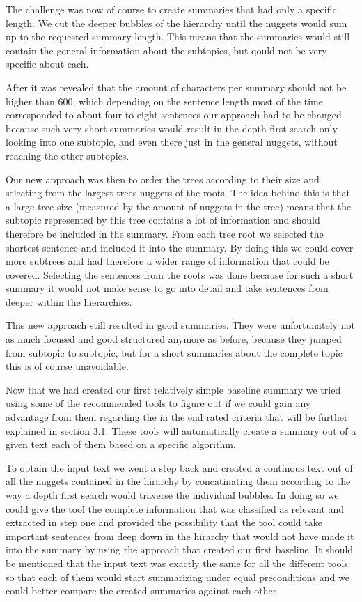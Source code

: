 The challenge was now of course to create summaries that had only a specific length. We cut the deeper bubbles of the hierarchy until the nuggets would sum up to the requested summary length. This means that the summaries would still contain the general information about the subtopics, but qould not be
very specific about each.

After it was revealed that the amount of characters per summary should not be higher than 600, which depending on the sentence length most of the time
corresponded to about four to eight sentences our approach had to be changed because such very short summaries would result in the depth first search only looking into one subtopic, and even there just in the general nuggets, without reaching the other subtopics.

Our new approach was then to order the trees according to their size and selecting from the largest trees nuggets of the roots. The idea behind this is that a large tree size (measured by the amount of nuggets in the tree) means that the subtopic represented by this tree contains a lot of information and should therefore be included in the summary. From each tree root we selected the shortest sentence and included it into the summary. By doing this we could cover more subtrees and had therefore a wider range of information that could be covered. Selecting the sentences from the roots was done because for such a short summary it would not make sense to go into detail and take sentences from deeper within the hierarchies. 

This new approach still resulted in good summaries. They were unfortunately not as much focused and
good structured anymore as before, because they jumped from subtopic to subtopic, but for a short summaries about the complete topic this is of course unavoidable.

Now that we had created our first relatively simple baseline summary we tried using some of the recommended tools to figure out if we could gain any advantage from them regarding the in the end rated criteria that will be further explained in section 3.1. These tools will automatically create a summary out of a given text each of them based on a specific algorithm. 

To obtain the input text we went a step back and created a continous text out of all the nuggets contained in the hirarchy by concatinating them according to the way a depth first search would traverse the individual bubbles. In doing so we could give the tool the complete information that was classified as relevant and extracted in step one and provided the possibility that the tool could take important sentences from deep down in the hirarchy that would not have made it into the summary by using the approach that created our first baseline. It should be mentioned that the input text was exactly the same for all the different tools so that each of them would start summarizing under equal preconditions and we could better compare the created summaries against each other. 

